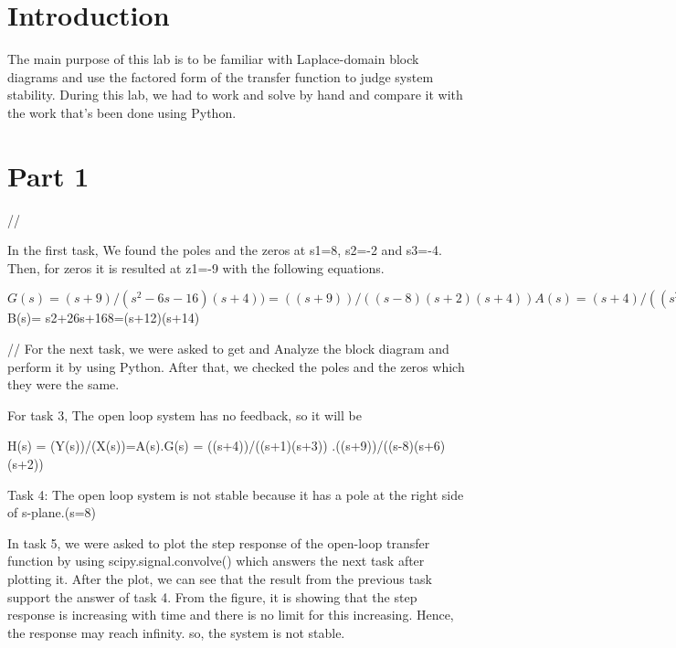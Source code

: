\documentclass[12pt]{report}
\begin{document}
\section{Introduction}
 

The main purpose of this lab is to be familiar with Laplace-domain block diagrams and use the factored form of the transfer
function to judge system stability. During this lab, we had to work and solve by hand and compare it with the work that's been done using Python. 




\section{Part 1}
\begin{itemize1}
    \item//
    
    In the first task, We found the poles and the zeros at s1=8, s2=-2 and s3=-4. Then, for zeros it is resulted at z1=-9 with the following equations.

$G(s)= (s+9)/(s^2-6s-16)(s+4))= ((s+9))/((s-8)(s+2)(s+4))

 A(s)= (s+4)/((s^2+4s+3))=  (s+4)/((s+1)(s+3))

 $B(s)= s2+26s+168=(s+12)(s+14)
\end{itemize1}

\begin{itemize2}
    \item//
For the next task, we were asked to get and Analyze the block diagram and perform it by using  Python. After that, we checked the poles and the zeros which they were the same.

For task 3, The open loop system has no feedback, so it will be 

 H(s) = (Y(s))/(X(s))=A(s).G(s)
= ((s+4))/((s+1)(s+3))  .((s+9))/((s-8)(s+6)(s+2))

Task 4: The open loop system is not stable because it has a pole at the right side of s-plane.(s=8)


In task 5, we were asked to plot the step response of the open-loop transfer function by using scipy.signal.convolve() which answers the next task after plotting it. After the plot, we can see that the result from the previous task support the answer of task 4. From the figure, it is showing that the step response is increasing with time and there is no limit for this increasing. Hence, the response may reach infinity. so, the system is not stable.
\end{itemize2}
\end{document}
